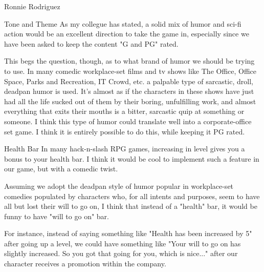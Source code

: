\documentclass[12pt]{report}
\begin{document}
\begin{section}{Ronnie Rodriguez}
\begin{subsection}{Tone and Theme}
As my collegue has stated, a solid mix of humor and sci-fi action would
be an excellent direction to take the game in, especially since we have been asked to 
keep the content "G and PG" rated. 

This begs the question, though, as to what brand of humor we should
be trying to use. In many comedic workplace-set films and tv shows like 
The Office, Office Space, Parks and Recreation, IT Crowd, etc. a palpable type of 
sarcastic, droll, deadpan humor is used. It's almost as if the characters in 
these shows have just had all the life sucked out of them by their boring, 
unfulfilling work, and almost everything that exits their mouths is 
a bitter, sarcastic quip at something or someone. I think this type of humor 
could translate well into a corporate-office set game. I think it is entirely
possible to do this, while keeping it PG rated. 
\end{subsection}

\begin{subsection}{Health Bar}
In many hack-n-slash RPG games, increasing in level gives you a bonus to 
your health bar. I think it would be cool to implement such a feature in our game, 
but with a comedic twist. 

Assuming we adopt the deadpan style of humor popular in workplace-set comedies populated
by characters who, for all intents and purposes, seem to have all but lost their will 
to go on, I think that instead of a "health" bar, it would be funny to have "will to go on" bar. 

For instance, instead of saying something like "Health has been increased by 5" after going 
up a level, we could have something like "Your will to go on has slightly increased. So you got that going for you,
which is nice..." after our character receives a promotion within the company.
\end{subsection}
\end{section}
\end{document}
